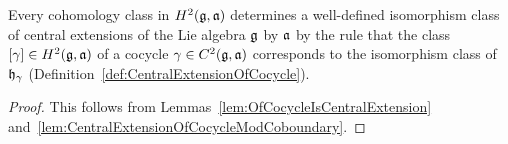 \begin{theorem}[]
  \label{thm:CentralExtensionOfCohomologyClass}
  Every cohomology class in $H^2(\mathfrak{g}, \mathfrak{a})$ determines a well-defined
  isomorphism class of central extensions of the Lie algebra $\mathfrak{g}$
  by $\mathfrak{a}$ by the rule that the class $[\gamma] \in H^2(\mathfrak{g}, \mathfrak{a})$ of
  a cocycle $\gamma \in C^2(\mathfrak{g}, \mathfrak{a})$ corresponds to the isomorphism
  class of $\mathfrak{h}_\gamma$ (Definition~\ref{def:CentralExtensionOfCocycle}).
\end{theorem}
\begin{proof}
  This follows from Lemmas~\ref{lem:OfCocycleIsCentralExtension}
  and~\ref{lem:CentralExtensionOfCocycleModCoboundary}.
\end{proof}
